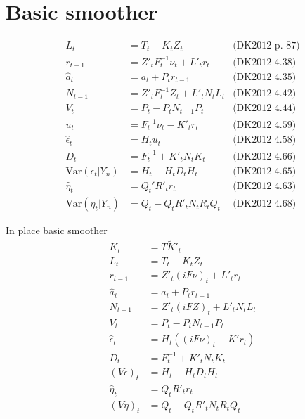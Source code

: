 \documentclass{article}
\begin{document}
\section{Basic smoother}
\begin{align*}
  L_t &= T_t - K_tZ_t & \mbox{(DK2012 p. 87)}\\
  r_{t-1} &= Z'_tF^{-1}_t\nu_t + L'_tr_t & \mbox{(DK2012 4.38)}\\
  \hat a_t &= a_t + P_tr_{t-1} & \mbox{(DK2012 4.35)}\\
  N_{t-1} &= Z'_tF^{-1}_tZ_t + L'_tN_tL_t & \mbox{(DK2012 4.42)}\\
  V_t &= P_t - P_tN_{t-1}P_t & \mbox{(DK2012 4.44)}\\
  u_t &= F^{-1}_t\nu_t - K'_tr_t & \mbox{(DK2012 4.59)}\\
  \hat \epsilon_t &= H_tu_t & \mbox{(DK2012 4.58)}\\
  D_t &= F^{-1}_t + K'_tN_tK_t & \mbox{(DK2012 4.66)}\\
  \mbox{Var}(\epsilon_t|Y_n) &= H_t - H_tD_tH_t & \mbox{(DK2012 4.65)}\\
  \hat \eta_t &= Q_t'R'_tr_t & \mbox{(DK2012 4.63)}\\
  \mbox{Var}(\eta_t|Y_n) &= Q_t - Q_tR'_tN_tR_tQ_t & \mbox{(DK2012 4.68)}                              
\end{align*}

In place basic smoother
\begin{align*}
  K_t &= T\tilde K'_t \\
  L_t &= T_t - K_tZ_t \\
  r_{t-1} &= Z'_t(iF\nu)_t + L'_tr_t \\
  \hat a_t &= a_t + P_tr_{t-1} \\
  N_{t-1} &= Z'_t(iFZ)_t + L'_tN_tL_t \\
  V_t &= P_t - P_tN_{t-1}P_t \\
  \hat \epsilon_t &= H_t((iF\nu)_t - K'r_t) \\
  D_t &= F^{-1}_t + K'_tN_tK_t \\
  (V\epsilon)_t &= H_t - H_tD_tH_t \\
  \hat \eta_t &= Q_tR'_tr_t \\
  (V\eta)_t &= Q_t - Q_tR'_tN_tR_tQ_t \\
\end{align*}
\end{document}
